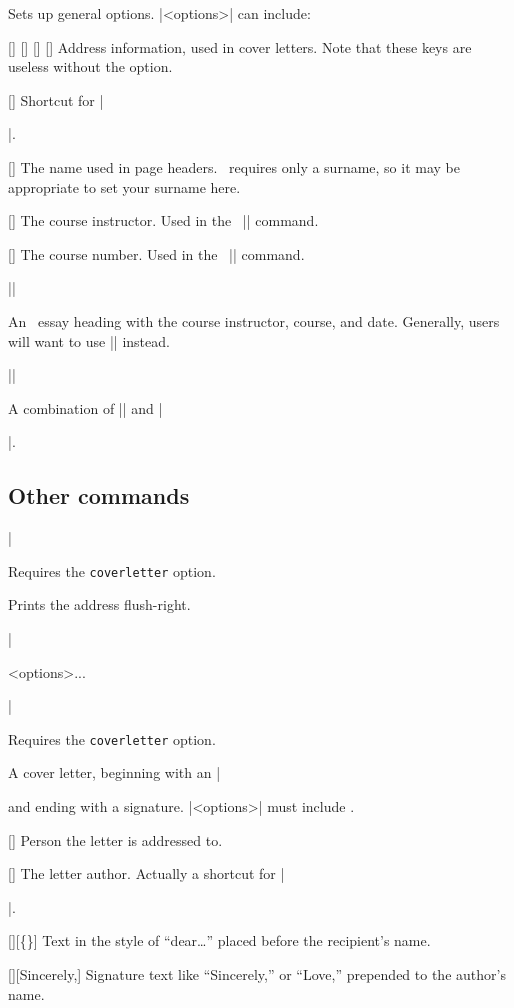 \documentclass{ltxguidex}
\newcommand{\reqopt}[1]{Requires the \texttt{\color{magenta}#1} option.\par}
\begin{document}
Sets up general options. |<options>| can include:
\begin{keys}
	[]
	[]
	[]
	[]
	Address information, used in cover letters. Note that these keys are
	useless without the  option.

	[]
	Shortcut for |\author{<author>}|.

	[]
	The name used in page headers. \mla\ requires only a surname, so it
	may be appropriate to set your surname here.

	[]
	The course instructor. Used in the \mla\ |\essayintro| command.

	[]
	The course number. Used in the \mla\ |\essayintro| command.
\end{keys}

\begin{desc}
|\heading|
\end{desc}
An \mla\ essay heading with the course instructor, course, and date.
Generally, users will want to use |\essayintro| instead.

\begin{desc}
|\essayintro|
\end{desc}
A combination of |\heading| and |\maketitle|.

\subsection{Other commands}

\begin{desc}
|\address|
\end{desc}
\reqopt{coverletter} Prints the address flush-right.

\begin{desc}
|\begin{coverletter}{<options>}...\end{coverletter}|
\end{desc}
\reqopt{coverletter} A cover letter, beginning with an |\address| and ending
with a signature. |<options>| must include .
\begin{keys}
	[]
	Person the letter is addressed to.

	[]
	The letter author. Actually a shortcut for |\author{<author>}|.

	[][\{\}]
	Text in the style of ``dear\dots'' placed before the recipient's
	name.

	[][Sincerely,]
	Signature text like ``Sincerely,'' or ``Love,'' prepended to the
	author's name.
\end{keys}
\end{document}
